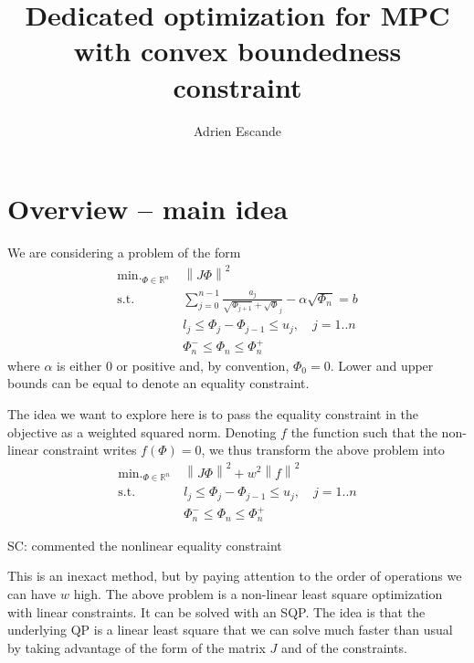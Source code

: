 \documentclass[]{article}
\newcommand{\SC}[1]{\begin{flushleft}{\color{red} SC: #1}\end{flushleft}}
\DeclareMathOperator*{\minimize}{\min.}
\newcommand{\st}{\mbox{s.t.}}
\begin{document}
\title{\Large Dedicated optimization for MPC with convex boundedness constraint}
\author{Adrien Escande}

\maketitle

\section{Overview -- main idea}
We are considering a problem of the form
\begin{align}
  \minimize_{\Phi \in \mathbb{R}^n}\ & \left\| J \Phi \right\|^2 \label{eq:problem}\\
  \st \ & \sum_{j=0}^{n-1} \frac{a_j}{\sqrt{\Phi_{j+1}} + \sqrt{\Phi}_j} - \alpha \sqrt{\Phi_n} = b \nonumber\\
        & l_j \leq \Phi_j - \Phi_{j-1} \leq u_j, \quad j=1..n \nonumber\\
        & \Phi_n^- \leq \Phi_n \leq \Phi_n^+ \nonumber
\end{align}
where $\alpha$ is either $0$ or positive and, by convention, $\Phi_0 = 0$. Lower and upper bounds can be equal to denote an equality constraint.

The idea we want to explore here is to pass the equality constraint in the objective as a weighted squared norm. Denoting $f$ the function such that the non-linear constraint writes $f(\Phi) = 0$, we thus transform the above problem into
\begin{align}
  \minimize_{\Phi \in \mathbb{R}^n}\ & \left\| J \Phi \right\|^2 + w^2 \left\|f\right\|^2\\
  \st \ 
        & l_j \leq \Phi_j - \Phi_{j-1} \leq u_j, \quad j=1..n \nonumber\\
        & \Phi_n^- \leq \Phi_n \leq \Phi_n^+ \nonumber
\end{align}
\SC{commented the nonlinear equality constraint}
This is an inexact method, but by paying attention to the order of operations
we can have $w$ high. The above problem is a non-linear least square
optimization with linear constraints. It can be solved with an SQP. The idea is
that the underlying QP is a linear least square that we can solve much faster
than usual by taking advantage of the form of the matrix $J$ and of the
constraints.
\end{document}
